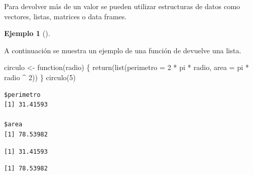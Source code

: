 \documentclass[
  a4paper,
]{scrreport}
\newenvironment{Shaded}{\begin{snugshade}}{\end{snugshade}}
\newcommand{\AttributeTok}[1]{\textcolor[rgb]{0.40,0.45,0.13}{#1}}
\newcommand{\ControlFlowTok}[1]{\textcolor[rgb]{0.00,0.23,0.31}{#1}}
\newcommand{\DecValTok}[1]{\textcolor[rgb]{0.68,0.00,0.00}{#1}}
\newcommand{\FunctionTok}[1]{\textcolor[rgb]{0.28,0.35,0.67}{#1}}
\newcommand{\NormalTok}[1]{\textcolor[rgb]{0.00,0.23,0.31}{#1}}
\newcommand{\OtherTok}[1]{\textcolor[rgb]{0.00,0.23,0.31}{#1}}
\newcommand{\SpecialCharTok}[1]{\textcolor[rgb]{0.37,0.37,0.37}{#1}}
\theoremstyle{definition}
\theoremstyle{definition}
\newtheorem{example}{Ejemplo}[chapter]
\theoremstyle{remark}
\begin{document}
Para devolver más de un valor se pueden utilizar estructuras de datos
como vectores, listas, matrices o data frames.

\leavevmode{}%
\begin{example}[]\label{exm-retorno-funcion-lista}

A continuación se muestra un ejemplo de una función de devuelve una
lista.

\begin{Shaded}
\begin{Highlighting}[]
\NormalTok{circulo }\OtherTok{\textless{}{-}} \ControlFlowTok{function}\NormalTok{(radio) \{}
  \FunctionTok{return}\NormalTok{(}\FunctionTok{list}\NormalTok{(}\AttributeTok{perimetro =} \DecValTok{2} \SpecialCharTok{*}\NormalTok{ pi }\SpecialCharTok{*}\NormalTok{ radio, }\AttributeTok{area =}\NormalTok{ pi }\SpecialCharTok{*}\NormalTok{ radio }\SpecialCharTok{\^{}} \DecValTok{2}\NormalTok{))}
\NormalTok{\}}
\FunctionTok{circulo}\NormalTok{(}\DecValTok{5}\NormalTok{)}
\end{Highlighting}
\end{Shaded}

\begin{verbatim}
$perimetro
[1] 31.41593

$area
[1] 78.53982
\end{verbatim}

\begin{Shaded}
\end{Shaded}

\begin{verbatim}
[1] 31.41593
\end{verbatim}

\begin{Shaded}
\end{Shaded}

\begin{verbatim}
[1] 78.53982
\end{verbatim}

\end{example}
\end{document}
